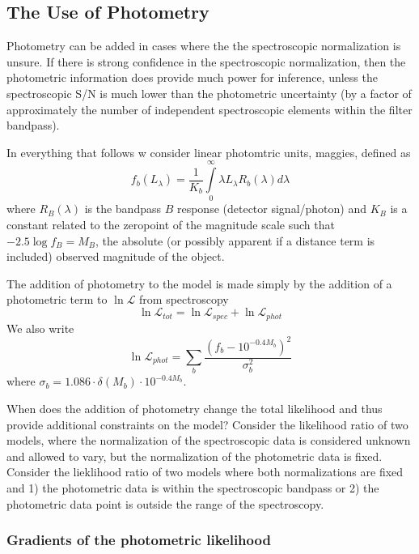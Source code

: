 \documentclass{emulateapj}
\begin{document}
\subsection{The Use of Photometry}
Photometry can be added in cases where the the spectroscopic normalization is unsure.  If there is strong confidence in the spectroscopic normalization, then the photometric information does provide much power for inference, unless the spectroscopic S/N is much lower than the photometric uncertainty (by a factor of approximately the number of independent spectroscopic elements within the filter bandpass).  

In everything that follows w consider linear photomtric units, maggies, defined as 
\begin{equation}
f_b(L_\lambda) = \frac{1}{K_b}\int\limits_0^\infty \lambda L_\lambda R_b(\lambda) d\lambda
\end{equation}
where $R_B(\lambda)$ is the bandpass $B$ response (detector signal/photon) and $K_B$ is a constant related to the zeropoint of the magnitude scale such that $-2.5 \log f_B = M_B$, the absolute (or possibly apparent if a distance term is included) observed magnitude of the object.

The addition of photometry to the model is made simply by the addition of a photometric term to $\ln \mathcal{L}$ from spectroscopy
\begin{equation}
\ln \mathcal{L} _{tot} = \ln \mathcal{L}_{spec} + \ln\mathcal{L}_{phot}
\end{equation}
We also write 
\begin{equation}
\ln \mathcal{L} _{phot} = \sum\limits_b \frac{(f_b - 10^{-0.4M_b})^2}{\sigma_b^2}
\end{equation}
where $\sigma_b = 1.086\cdot\delta(M_b)\cdot 10^{-0.4M_b}$.

When does the addition of photometry change the total likelihood and thus provide additional constraints on the model?  Consider the likelihood ratio of two models, where the normalization of the spectroscopic data is considered unknown and allowed to vary, but the normalization of the photometric data is fixed.  Consider the lieklihood ratio of two models where both normalizations are fixed and 1) the photometric data is within the spectroscopic bandpass or 2) the photometric data point is outside the range of the spectroscopy. 

\subsubsection{Gradients of the photometric likelihood}
\end{document}
